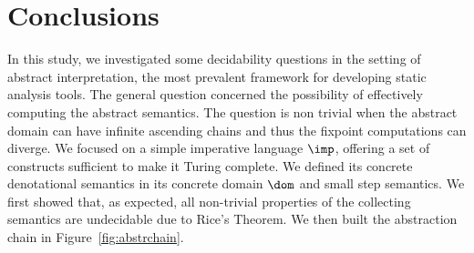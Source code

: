 \chapter{Conclusions}\label{ch:conclusion}

In this study, we investigated some decidability questions in the
setting of abstract interpretation, the most prevalent framework for
developing static analysis tools.  The general question concerned the
possibility of effectively computing the abstract semantics. The
question is non trivial when the abstract domain can have infinite
ascending chains and thus the fixpoint computations can diverge.  We
focused on a simple imperative language \(\imp\), offering a set of
constructs sufficient to make it Turing complete. We defined its
concrete denotational semantics in its concrete domain \(\dom\) and
small step semantics. We first showed that, as expected, all
non-trivial properties of the collecting semantics are undecidable due
to Rice's Theorem. We then built the abstraction chain in
Figure~\ref{fig:abstrchain}.
